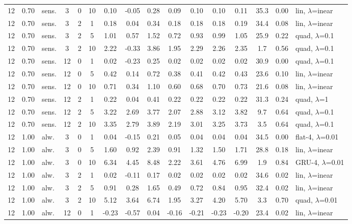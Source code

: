 \documentclass[10pt]{article}
\begin{document}
\begin{scriptsize}
\begin{longtable}{cclcc c ccc ccc c cc l}
12 & 0.70 & sens. & 3 & 0 & 10 & 0.10 & -0.05 & 0.28 & 0.09 & 0.10 & 0.10 & 0.11 & 35.3 & 0.00 & lin, $\lambda$=inear \\
12 & 0.70 & sens. & 3 & 2 & 1 & 0.18 & 0.04 & 0.34 & 0.18 & 0.18 & 0.18 & 0.19 & 34.4 & 0.08 & lin, $\lambda$=inear \\
12 & 0.70 & sens. & 3 & 2 & 5 & 1.01 & 0.57 & 1.52 & 0.72 & 0.93 & 0.99 & 1.05 & 25.9 & 0.22 & quad, $\lambda$=0.1 \\
12 & 0.70 & sens. & 3 & 2 & 10 & 2.22 & -0.33 & 3.86 & 1.95 & 2.29 & 2.26 & 2.35 & 1.7 & 0.56 & quad, $\lambda$=0.1 \\
12 & 0.70 & sens. & 12 & 0 & 1 & 0.02 & -0.23 & 0.25 & 0.02 & 0.02 & 0.02 & 0.02 & 30.9 & 0.00 & quad, $\lambda$=0.1 \\
12 & 0.70 & sens. & 12 & 0 & 5 & 0.42 & 0.14 & 0.72 & 0.38 & 0.41 & 0.42 & 0.43 & 23.6 & 0.10 & lin, $\lambda$=inear \\
12 & 0.70 & sens. & 12 & 0 & 10 & 0.71 & 0.34 & 1.10 & 0.60 & 0.68 & 0.70 & 0.73 & 21.6 & 0.08 & lin, $\lambda$=inear \\
12 & 0.70 & sens. & 12 & 2 & 1 & 0.22 & 0.04 & 0.41 & 0.22 & 0.22 & 0.22 & 0.22 & 31.3 & 0.24 & quad, $\lambda$=1 \\
12 & 0.70 & sens. & 12 & 2 & 5 & 3.22 & 2.69 & 3.77 & 2.07 & 2.88 & 3.12 & 3.82 & 9.7 & 0.64 & quad, $\lambda$=0.1 \\
12 & 0.70 & sens. & 12 & 2 & 10 & 3.35 & 2.79 & 3.89 & 2.19 & 3.01 & 3.25 & 3.73 & 3.5 & 0.64 & quad, $\lambda$=0.1 \\
12 & 1.00 & alw. & 3 & 0 & 1 & 0.04 & -0.15 & 0.21 & 0.05 & 0.04 & 0.04 & 0.04 & 34.5 & 0.00 & flat-4, $\lambda$=0.01 \\
12 & 1.00 & alw. & 3 & 0 & 5 & 1.60 & 0.92 & 2.39 & 0.91 & 1.32 & 1.50 & 1.71 & 28.8 & 0.18 & lin, $\lambda$=inear \\
12 & 1.00 & alw. & 3 & 0 & 10 & 6.34 & 4.45 & 8.48 & 2.22 & 3.61 & 4.76 & 6.99 & 1.9 & 0.84 & GRU-4, $\lambda$=0.01 \\
12 & 1.00 & alw. & 3 & 2 & 1 & 0.02 & -0.11 & 0.17 & 0.02 & 0.02 & 0.02 & 0.02 & 34.6 & 0.02 & lin, $\lambda$=inear \\
12 & 1.00 & alw. & 3 & 2 & 5 & 0.91 & 0.28 & 1.65 & 0.49 & 0.72 & 0.84 & 0.95 & 32.4 & 0.02 & lin, $\lambda$=inear \\
12 & 1.00 & alw. & 3 & 2 & 10 & 5.12 & 3.64 & 6.74 & 1.95 & 3.27 & 4.20 & 5.70 & 3.3 & 0.70 & quad, $\lambda$=0.01 \\
12 & 1.00 & alw. & 12 & 0 & 1 & -0.23 & -0.57 & 0.04 & -0.16 & -0.21 & -0.23 & -0.20 & 23.4 & 0.02 & lin, $\lambda$=inear \\

\end{longtable}
\end{scriptsize}
\end{document}
